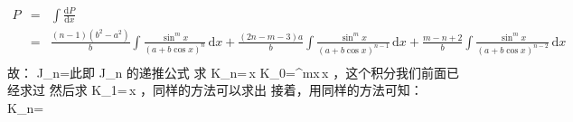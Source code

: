 \begin{eqnarray} P&=&\int\frac{\mathrm{d}P}{\mathrm{d}x}\\ &=&\frac{(n-1)(b^2-a^2)}{b}\int\frac{\sin^mx}{(a+b\cos x)^n}\,\mathrm{d}x+\frac{(2n-m-3)a}{b}\int\frac{\sin^mx}{(a+b\cos x)^{n-1}}\,\mathrm{d}x+\frac{m-n+2}{b}\int\frac{\sin^mx}{(a+b\cos x)^{n-2}}\,\mathrm{d}x\\  \end{eqnarray}
故：
J_n=
此即 J_n 的递推公式
求 K_n=\int {}\,x
K_0=\int \cos^mx\,x ，这个积分我们前面已经求过
然后求 K_1=\int {}\,x ，同样的方法可以求出
接着，用同样的方法可知：
K_n=